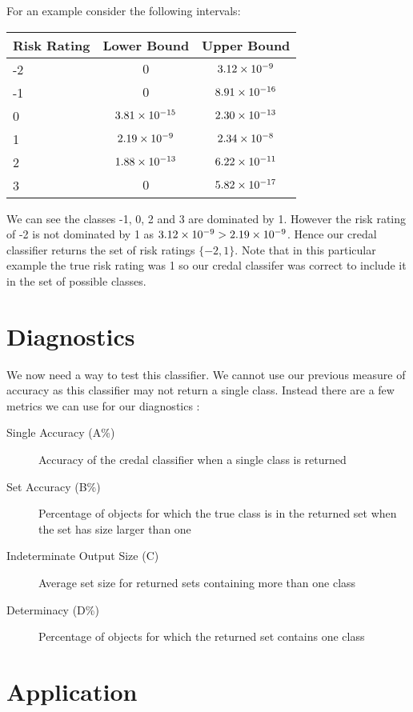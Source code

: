 For an example consider the following intervals:
\begin{center}
	\begin{tabular}{l|c c}
	Risk Rating & Lower Bound & Upper Bound \\
	\hline
	-2          & $0$              & ${3.12}\times 10^{-9}$  \\
	-1          & $0$              & ${8.91}\times 10^{-16}$ \\
	0           & ${3.81}\times 10^{-15}$ & ${2.30}\times 10^{-13}$ \\
	1           & ${2.19}\times 10^{-9}$  & ${2.34}\times 10^{-8}$  \\
	2           & ${1.88}\times 10^{-13}$ & ${6.22}\times 10^{-11}$ \\
	3           & $0$              & ${5.82}\times 10^{-17}$ \\
	\end{tabular}
\end{center}
We can see the classes -1, 0, 2 and 3 are dominated by 1.
However the risk rating of -2 is not dominated by 1 as ${3.12}\times 10^{-9} > {2.19}\times 10^{-9}$.
Hence our credal classifier returns the set of risk ratings $\{-2, 1\}$.
Note that in this particular example the true risk rating was 1 so our credal classifer was correct to include it in the set of possible classes.

\section{Diagnostics}

We now need a way to test this classifier.
We cannot use our previous measure of accuracy as this classifier may not return a single class.
Instead there are a few metrics we can use for our diagnostics \cite{Antonucci11}:
\begin{description}
	\item[Single Accuracy (A\%)] Accuracy of the credal classifier when a single class is returned
	\item[Set Accuracy (B\%)] Percentage of objects for which the true class is in the returned set when the set has size larger than one
	\item[Indeterminate Output Size (C)] Average set size for returned sets containing more than one class
	\item[Determinacy (D\%)] Percentage of objects for which the returned set contains one class
\end{description}

\section{Application}

